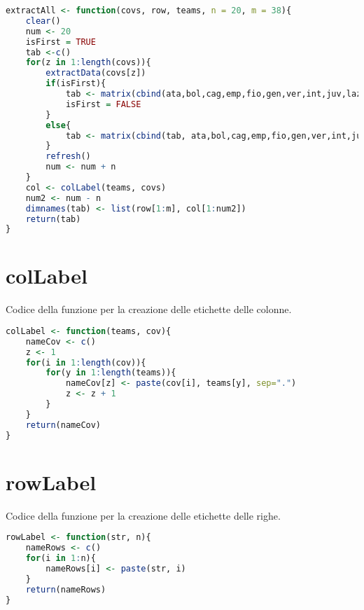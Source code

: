 \begin{lstlisting}[language=R, caption={Codice per estrarre le informazioni di tutte le variabili.}, captionpos=b, label=code:a6]
extractAll <- function(covs, row, teams, n = 20, m = 38){
	clear()
	num <- 20
	isFirst = TRUE
	tab <-c()
	for(z in 1:length(covs)){
		extractData(covs[z])
		if(isFirst){
			tab <- matrix(cbind(ata,bol,cag,emp,fio,gen,ver,int,juv,laz,mil,nap,rom,sal,sam,sas,spe,tor,udi,ven), nrow = m, ncol = num)
			isFirst = FALSE
		}
		else{
			tab <- matrix(cbind(tab, ata,bol,cag,emp,fio,gen,ver,int,juv,laz,mil,nap,rom,sal,sam,sas,spe,tor,udi,ven), nrow = m, ncol = num)
		}
		refresh()
		num <- num + n 		
	}
	col <- colLabel(teams, covs)  
	num2 <- num - n
	dimnames(tab) <- list(row[1:m], col[1:num2])
	return(tab)
}
\end{lstlisting}

\section{colLabel}
\label{sez:Z1.3}
Codice della funzione per la creazione delle etichette delle colonne.

\begin{lstlisting}[language=R, caption={Codice per la creazione delle etichette delle colonne.}, captionpos=b, label=code:a7]
colLabel <- function(teams, cov){
	nameCov <- c()
	z <- 1
	for(i in 1:length(cov)){
		for(y in 1:length(teams)){
			nameCov[z] <- paste(cov[i], teams[y], sep=".")
			z <- z + 1
		}
	}
	return(nameCov)
}

\end{lstlisting}

\section{rowLabel}
\label{sez:Z1.4}
Codice della funzione per la creazione delle etichette delle righe.

\begin{lstlisting}[language=R, caption={Codice per la creazione delle etichette delle righe.}, captionpos=b, label=code:a8]
rowLabel <- function(str, n){
	nameRows <- c()
	for(i in 1:n){
		nameRows[i] <- paste(str, i)
	}
	return(nameRows)
}

\end{lstlisting}

